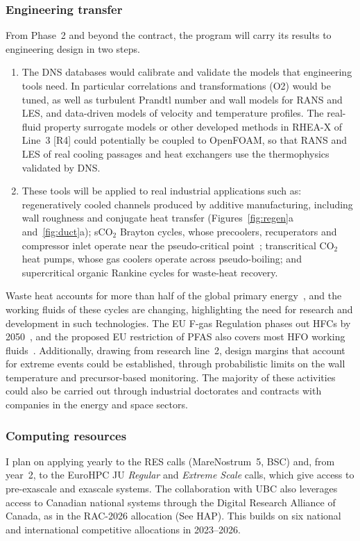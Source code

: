 \documentclass[11pt]{article}
\newcommand{\NEW}[1]{\iffinal #1\else{\color{red}#1}\fi}
\begin{document}
\subsubsection{Engineering transfer} 
From Phase~2 and beyond the contract, the program will carry its results to engineering design in two steps.
\begin{enumerate}
	\item The DNS databases would calibrate and validate the models that engineering tools need. In particular correlations and transformations (O2) would be tuned, as well as turbulent Prandtl number and wall models for RANS and LES, and data-driven models of velocity and temperature profiles. The real-fluid property surrogate models or other developed methods in RHEA-X of Line~3 [R4] could \NEW{potentially} be coupled to OpenFOAM, so that RANS and LES of real cooling passages and heat exchangers use the thermophysics validated by DNS.
	
	\item \NEW{These} tools will be applied to real industrial applications such as: regeneratively cooled channels produced by additive manufacturing, including wall roughness and conjugate heat transfer (Figures~\ref{fig:regen}a and~\ref{fig:duct}a); 
	sCO$_2$ Brayton cycles, whose precoolers, recuperators and compressor inlet operate near the pseudo-critical point~\cite{Ahn2015}; 
	\NEW{transcritical} CO$_2$ heat pumps, whose gas coolers operate across pseudo-boiling; and \NEW{supercritical} organic Rankine cycles for waste-heat recovery. 
\end{enumerate}
Waste heat accounts for more than half of the global primary energy~\cite{Markides2025}, and the working fluids of these cycles are changing, highlighting the need for research and development in such technologies. The EU F-gas Regulation phases out HFCs by 2050~\cite{FGas2024}, and the proposed EU restriction of PFAS also covers most HFO working fluids~\cite{ECHA2025}. 
Additionally, drawing from research line~2, design margins that account for extreme events could be established, through probabilistic limits on the wall temperature and precursor-based monitoring.
The majority of these activities could also be carried out through industrial doctorates and contracts with companies in the energy and space sectors.


\subsubsection{Computing resources} 
I plan on applying yearly to the RES calls (MareNostrum~5, BSC) and, from year~2, to the EuroHPC JU \emph{Regular} and \emph{Extreme Scale} calls, which give access to pre-exascale and exascale systems. 
The collaboration with UBC also leverages access to Canadian
national systems through the Digital Research Alliance of Canada, as in the RAC-2026 allocation (See HAP). 
This builds on six national and international competitive allocations in 2023--2026.
\end{document}

